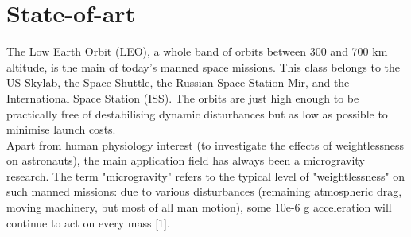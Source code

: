 \documentclass[a4paper,12pt,oneside]{report}
\begin{document}
\section{State-of-art}\label{state_of_art}
The Low Earth Orbit (LEO), a whole band of orbits between 300 and 700 km altitude, is the main of today's manned space missions. This class belongs to the US Skylab, the Space Shuttle, the Russian Space Station Mir, and the International Space Station (ISS). The orbits are just high enough to be practically free of destabilising dynamic disturbances but as low as possible to minimise launch costs.\\
Apart from human physiology interest (to investigate the effects of weightlessness on astronauts), the main application field has always been a microgravity research. The term "microgravity" refers to the typical level of "weightlessness" on such manned missions: due to various disturbances (remaining atmospheric drag, moving machinery, but most of all man motion), some 10e-6 g acceleration will continue to act on every mass [1].\\
\end{document}
